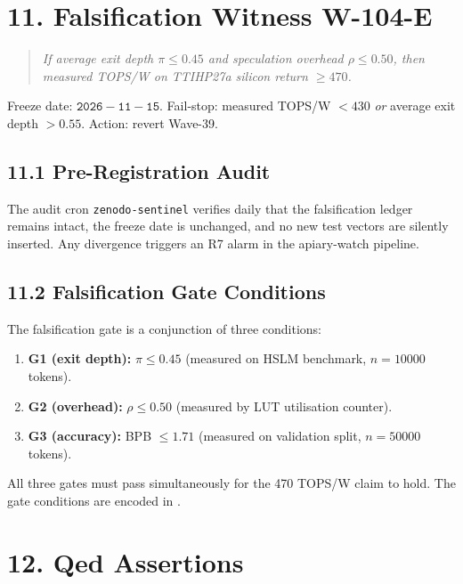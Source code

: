 \section{11. Falsification Witness W-104-E}\label{fa_85:falsification}

\begin{quote}\itshape
If average exit depth \(\pi \le 0.45\) and speculation
overhead \(\rho \le 0.50\), then measured TOPS/W on
TTIHP27a silicon return \(\ge 470\).
\end{quote}

Freeze date: \(\mathtt{2026{-}11{-}15}\). Fail-stop:
measured TOPS/W \(< 430\) \emph{or} average exit
depth \(> 0.55\). Action: revert Wave-39.

\subsection{11.1 Pre-Registration Audit}

The audit cron \texttt{zenodo-sentinel} verifies daily
that the falsification ledger remains intact, the
freeze date is unchanged, and no new test vectors are
silently inserted. Any divergence triggers an R7 alarm
in the apiary-watch pipeline.

\subsection{11.2 Falsification Gate Conditions}

The falsification gate is a conjunction of three
conditions:

\begin{enumerate}
\tightlist
\item \textbf{G1 (exit depth):} \(\pi \le 0.45\)
      (measured on HSLM benchmark, \(n = 10000\) tokens).
\item \textbf{G2 (overhead):} \(\rho \le 0.50\)
      (measured by LUT utilisation counter).
\item \textbf{G3 (accuracy):} BPB \(\le 1.71\)
      (measured on validation split, \(n = 50000\)
      tokens).
\end{enumerate}

All three gates must pass simultaneously for the
470 TOPS/W claim to hold. The gate conditions are
encoded in
.

\section{12. Qed Assertions}\label{fa_85:qed-assertions}

